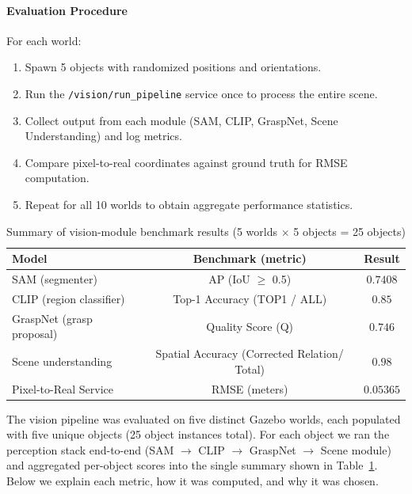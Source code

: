 \documentclass[12pt]{extarticle}
\begin{document}
\paragraph{Evaluation Procedure}
For each world:
\begin{enumerate}
    \item Spawn 5 objects with randomized positions and orientations.
    \item Run the \texttt{/vision/run\_pipeline} service once to process the entire scene.
    \item Collect output from each module (SAM, CLIP, GraspNet, Scene Understanding) and log metrics.
    \item Compare pixel-to-real coordinates against ground truth for RMSE computation.
    \item Repeat for all 10 worlds to obtain aggregate performance statistics.
\end{enumerate}

\begin{table}[h!]
\centering
\caption{Summary of vision-module benchmark results (5 worlds $\times$ 5 objects = 25 objects)}
\label{tab:vision-eval}
\begin{tabular}{lcc}
\hline
\textbf{Model} & \textbf{Benchmark (metric)} & \textbf{Result} \\
\hline
SAM (segmenter) & AP (IoU $\ge$ 0.5) & $0.7408$ \\
CLIP (region classifier) & Top-1 Accuracy (TOP1 / ALL) & $0.85$ \\
GraspNet (grasp proposal) & Quality Score (Q) & $0.746$ \\
Scene understanding & Spatial Accuracy (Corrected Relation/ Total) & $0.98$ \\
Pixel-to-Real Service & RMSE (meters) & $0.05365$ \\
\hline
\end{tabular}
\end{table}

The vision pipeline was evaluated on five distinct Gazebo worlds, each populated with five unique objects (25 object instances total). For each object we ran the perception stack end-to-end (SAM $\rightarrow$ CLIP $\rightarrow$ GraspNet $\rightarrow$ Scene module) and aggregated per-object scores into the single summary shown in Table~\ref{tab:vision-eval}. Below we explain each metric, how it was computed, and why it was chosen.
\end{document}
